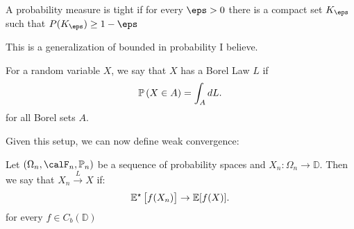 \begin{definition}
	\label{def:tight}
	A probability measure is tight if for every \(\eps > 0\) there is a compact set  \(K_\eps\) such that  \(P(K_\eps) \geq  1-\eps\)
\end{definition}
This is a generalization of bounded in probability I believe. 
\begin{definition}
	\label{def:borel-law}
	For a random variable \(X\), we say that  \(X\) has a Borel Law  \(L\) if
	 \[
		 \P\left(X\in A\right) = \int_A dL
	.\] 
	for all Borel sets \(A\). 
\end{definition}
Given this setup, we can now define weak convergence:
\begin{definition}
	\label{def:wcov}
	Let \((\Omega_n, \calF_n,\P_n)\) be a sequence of probability spaces and  \(X_n:\Omega_n \to \mathbb{D}\). Then we say that \(X_n\overset{L}{\to}X\) if:
	 \[
		 \E^\star\left[f(X_n)\right]\to \E[f(X)]
	.\] 
	for every \(f \in C_b(\mathbb{D})\)
\end{definition}


